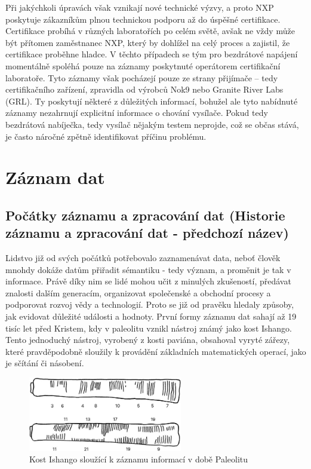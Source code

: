 Při jakýchkoli úpravách však vznikají nové technické výzvy, a proto NXP poskytuje zákazníkům plnou technickou podporu až do úspěšné certifikace. Certifikace 
probíhá v různých laboratořích po celém světě, avšak ne vždy může být přítomen zaměstnanec NXP, který by dohlížel na celý proces a zajistil, že certifikace 
proběhne hladce. V těchto případech se tým pro bezdrátové napájení momentálně spoléhá pouze na záznamy poskytnuté operátorem certifikační laboratoře. 
Tyto záznamy však pocházejí pouze ze strany přijímače – tedy certifikačního zařízení, zpravidla od výrobců Nok9 nebo Granite River Labs (GRL). Ty poskytují 
některé z důležitých informací, bohužel ale tyto nabídnuté záznamy nezahrnují explicitní informace o chování vysílače. Pokud tedy bezdrátová nabíječka, tedy 
vysílač nějakým testem neprojde, což se občas stává, je často náročné zpětně identifikovat příčinu problému. \cite{nxp_wireless_charging_team}


\chapter{Záznam dat}
\label{zaznam_dat}

\label{uvod}

\section{Počátky záznamu a zpracování dat (Historie záznamu a zpracování dat - předchozí název)}
\label{historie}
Lidstvo již od svých počátků potřebovalo zaznamenávat data, neboť člověk mnohdy dokáže datům přiřadit sémantiku - tedy význam, a proměnit je tak v informace. 
Právě díky nim se lidé mohou učit z minulých zkušeností, předávat znalosti dalším generacím, organizovat společenské a obchodní procesy a podporovat rozvoj 
vědy a technologií. Proto se již od pravěku hledaly způsoby, jak evidovat důležité události a hodnoty. První formy záznamu dat sahají až 19 tisíc let před 
Kristem, kdy v paleolitu vznikl nástroj známý jako kost Ishango. Tento jednoduchý nástroj, vyrobený z kosti paviána, obsahoval vyryté zářezy, které 
pravděpodobně sloužily k provádění základních matematických operací, jako je sčítání či násobení.

\begin{figure}[h] %
    \centering
    \includegraphics[width=0.6\textwidth]{obrazky-figures/ishango.jpg}
    \caption{Kost Ishango sloužící k záznamu informací v době Paleolitu \cite{ishango_picture}}
    \label{fig:ishango}
\end{figure}

